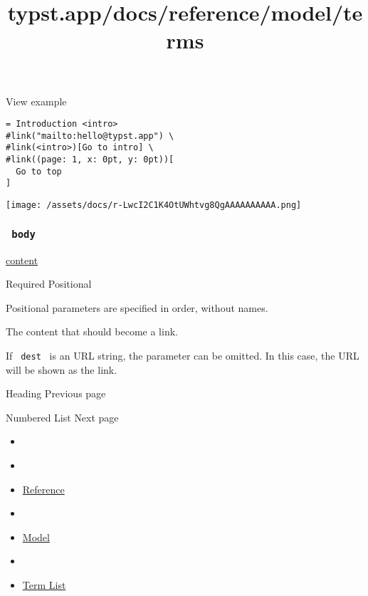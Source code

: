 
View example

\begin{verbatim}
= Introduction <intro>
#link("mailto:hello@typst.app") \
#link(<intro>)[Go to intro] \
#link((page: 1, x: 0pt, y: 0pt))[
  Go to top
]
\end{verbatim}

\texttt{[image: /assets/docs/r-LwcI2C1K4OtUWhtvg8QgAAAAAAAAAA.png]}

\subsubsection{\texorpdfstring{\texttt{\ body\ }}{ body }}\label{parameters-body}

\href{/docs/reference/foundations/content/}{content}

{Required} {{ Positional }}

\label{parameters-body-positional-tooltip}
Positional parameters are specified in order, without names.

The content that should become a link.

If \texttt{\ dest\ } is an URL string, the parameter can be omitted. In
this case, the URL will be shown as the link.

\href{/docs/reference/model/heading/}{\pandocbounded{}}

{ Heading } { Previous page }

\href{/docs/reference/model/enum/}{\pandocbounded{}}

{ Numbered List } { Next page }


\title{typst.app/docs/reference/model/terms}

\begin{itemize}
\tightlist
\item
  \href{/docs}{}
\item
  
\item
  \href{/docs/reference/}{Reference}
\item
  
\item
  \href{/docs/reference/model/}{Model}
\item
  
\item
  \href{/docs/reference/model/terms/}{Term List}
\end{itemize}

